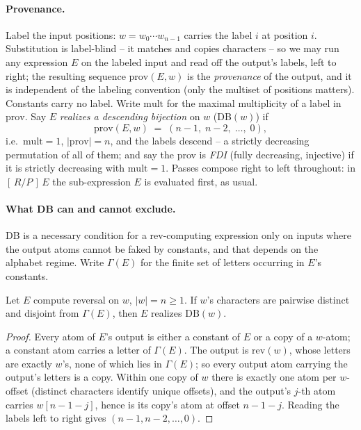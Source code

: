 \paragraph{Provenance.}
Label the input positions: $w = w_0 \cdots w_{n-1}$ carries the label
$i$ at position $i$.  Substitution is label-blind -- it matches and
copies characters -- so we may run any expression $E$ on the labeled
input and read off the output's labels, left to right; the resulting
sequence $\mathrm{prov}(E,w)$ is the \emph{provenance} of the output,
and it is independent of the labeling convention (only the multiset of
positions matters).  Constants carry no label.  Write $\mathrm{mult}$
for the maximal multiplicity of a label in $\mathrm{prov}$.  Say $E$
\emph{realizes a descending bijection} on $w$ (DB$(w)$) if
\[
\mathrm{prov}(E,w) \;=\; (n-1,\; n-2,\; \ldots,\; 0),
\]
i.e.\ $\mathrm{mult} = 1$, $|\mathrm{prov}| = n$, and the labels
descend -- a strictly decreasing permutation of all of them; and say
the prov is \emph{FDI} (fully decreasing, injective) if it is strictly
decreasing with $\mathrm{mult} = 1$.  Passes compose right to
left throughout: in $[\,R/P\,]\,E$ the sub-expression $E$ is
evaluated first, as usual.

\paragraph{What DB can and cannot exclude.}
DB is a necessary condition for a $\mathrm{rev}$-computing expression
only on inputs where the output atoms cannot be faked by constants,
and that depends on the alphabet regime.  Write $\Gamma(E)$ for the
finite set of letters occurring in $E$'s constants.

\begin{lemma}[forcing]
    \label{lem:forcing}
    Let $E$ compute reversal on $w$, $|w| = n \geq 1$.  If $w$'s
    characters are pairwise distinct and disjoint from $\Gamma(E)$,
    then $E$ realizes $\mathrm{DB}(w)$.
\end{lemma}

\begin{proof}
    Every atom of $E$'s output is either a constant of $E$ or a copy
    of a $w$-atom; a constant atom carries a letter of $\Gamma(E)$.
    The output is $\mathrm{rev}(w)$, whose letters are exactly $w$'s,
    none of which lies in $\Gamma(E)$; so every output atom carrying
    the output's letters is a copy.  Within one copy of $w$ there is
    exactly one atom per $w$-offset (distinct characters identify
    unique offsets), and the output's $j$-th atom carries
    $w[n-1-j]$, hence is its copy's atom at offset $n-1-j$.  Reading
    the labels left to right gives $(n-1, n-2, \ldots, 0)$.
\end{proof}

